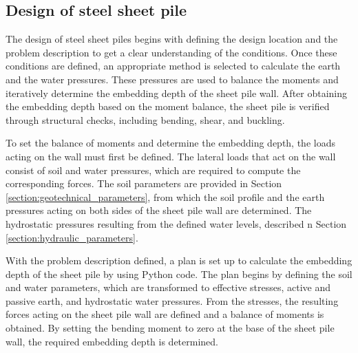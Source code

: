 



\newpage

\subsection{Design of steel sheet pile}
\label{section:design_sheet_pile}

The design of steel sheet piles begins with defining the design location and the problem description to get a clear understanding of the conditions. Once these conditions are defined, an appropriate method is selected to calculate the earth and the water pressures. These pressures are used to balance the moments and iteratively determine the embedding depth of the sheet pile wall. After obtaining the embedding depth based on the moment balance, the sheet pile is verified through structural checks, including bending, shear, and buckling.

To set the balance of moments and determine the embedding depth, the loads acting on the wall must first be defined. The lateral loads that act on the wall consist of soil and water pressures, which are required to compute the corresponding forces. The soil parameters are provided in Section \ref{section:geotechnical_parameters}, from which the soil profile and the earth pressures acting on both sides of the sheet pile wall are determined. The hydrostatic pressures resulting from the defined water levels, described n Section \ref{section:hydraulic_parameters}. 

With the problem description defined, a plan is set up to calculate the embedding depth of the sheet pile by using Python code. The plan begins by defining the soil and water parameters, which are transformed to effective stresses, active and passive earth, and hydrostatic water pressures. From the stresses, the resulting forces acting on the sheet pile wall are defined and a balance of moments is obtained. By setting the bending moment to zero at the base of the sheet pile wall, the required embedding depth is determined.

